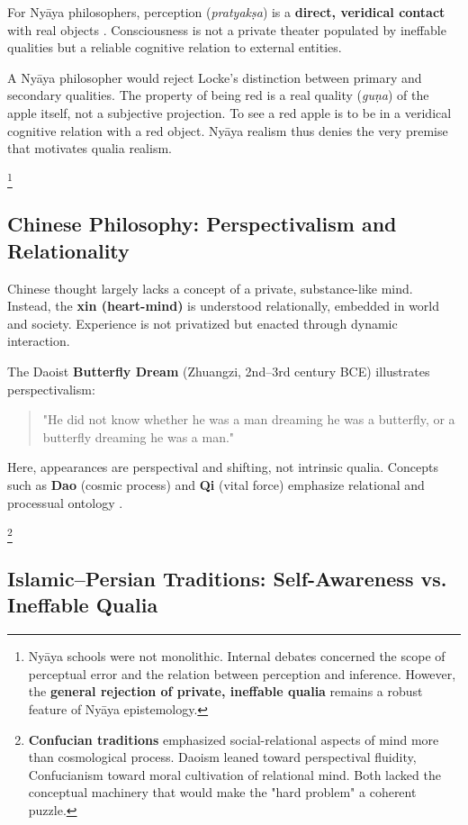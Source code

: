\documentclass[11pt,a4paper]{article}
\begin{document}
For Nyāya philosophers, perception (\emph{pratyakṣa}) is a \textbf{direct, veridical contact} with real objects \cite{matilal1986, phillips1995}. Consciousness is not a private theater populated by ineffable qualities but a reliable cognitive relation to external entities.

A Nyāya philosopher would reject Locke's distinction between primary and secondary qualities. The property of being red is a real quality (\emph{guṇa}) of the apple itself, not a subjective projection. To see a red apple is to be in a veridical cognitive relation with a red object. Nyāya realism thus denies the very premise that motivates qualia realism.

\footnote{Nyāya schools were not monolithic. Internal debates concerned the scope of perceptual error and the relation between perception and inference. However, the \textbf{general rejection of private, ineffable qualia} remains a robust feature of Nyāya epistemology.}

\subsection{Chinese Philosophy: Perspectivalism and Relationality}

Chinese thought largely lacks a concept of a private, substance-like mind. Instead, the \textbf{xin (heart-mind)} is understood relationally, embedded in world and society. Experience is not privatized but enacted through dynamic interaction.

The Daoist \textbf{Butterfly Dream} (Zhuangzi, 2nd–3rd century BCE) illustrates perspectivalism:

\begin{quote}
"He did not know whether he was a man dreaming he was a butterfly, or a butterfly dreaming he was a man."
\end{quote}

Here, appearances are perspectival and shifting, not intrinsic qualia. Concepts such as \textbf{Dao} (cosmic process) and \textbf{Qi} (vital force) emphasize relational and processual ontology \cite{hansen1992, ames2001}.

\footnote{\textbf{Confucian traditions} emphasized social-relational aspects of mind more than cosmological process. Daoism leaned toward perspectival fluidity, Confucianism toward moral cultivation of relational mind. Both lacked the conceptual machinery that would make the "hard problem" a coherent puzzle.}

\subsection{Islamic–Persian Traditions: Self-Awareness vs. Ineffable Qualia}
\end{document}
